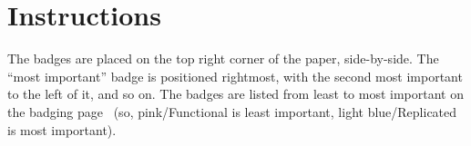\documentclass[sigplan]{acmart}
\begin{document}
\section{Instructions}
The badges are placed on the top right corner of the paper, side-by-side. The “most important” badge is positioned rightmost, with the second most important to the left of it, and so on. The badges are listed from least to most important on the badging page~\cite{ACM} (so, pink/Functional is least important, light blue/Replicated is most important).



\end{document}
